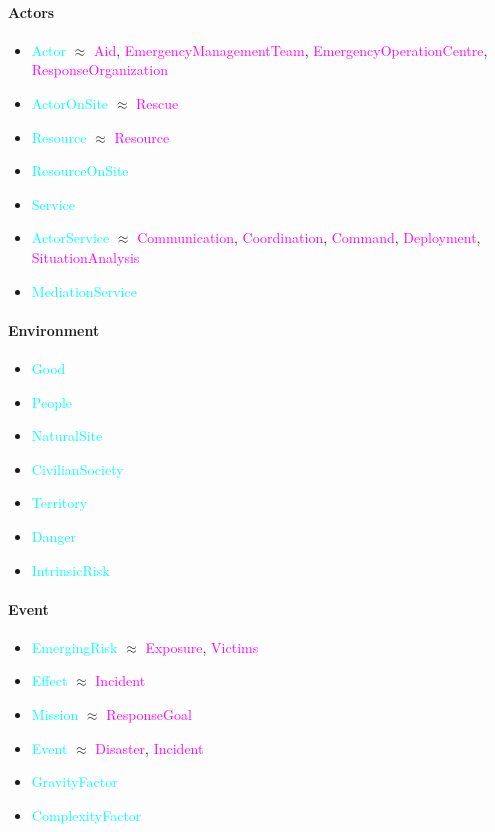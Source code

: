 \label{sec:information-si}
\paragraph{Actors}
\begin{itemize}
    \item \textcolor{cyan}{Actor} $\approx$ \textcolor{magenta}{Aid}, \textcolor{magenta}{EmergencyManagementTeam}, \textcolor{magenta}{EmergencyOperationCentre}, \textcolor{magenta}{ResponseOrganization}
    \item \textcolor{cyan}{ActorOnSite} $\approx$ \textcolor{magenta}{Rescue}
    \item \textcolor{cyan}{Resource} $\approx$ \textcolor{magenta}{Resource}
    \item \textcolor{cyan}{ResourceOnSite}
    \item \textcolor{cyan}{Service}
    \item \textcolor{cyan}{ActorService} $\approx$ \textcolor{magenta}{Communication}, \textcolor{magenta}{Coordination}, \textcolor{magenta}{Command}, \textcolor{magenta}{Deployment}, \textcolor{magenta}{SituationAnalysis}
    \item \textcolor{cyan}{MediationService}
\end{itemize}

\paragraph{Environment}
\begin{itemize}
    \item \textcolor{cyan}{Good}
    \item \textcolor{cyan}{People}
    \item \textcolor{cyan}{NaturalSite}
    \item \textcolor{cyan}{CivilianSociety}
    \item \textcolor{cyan}{Territory}
    \item \textcolor{cyan}{Danger}
    \item \textcolor{cyan}{IntrinsicRisk}
\end{itemize}

\paragraph{Event}
\begin{itemize}
    \item \textcolor{cyan}{EmergingRisk} $\approx$ \textcolor{magenta}{Exposure}, \textcolor{magenta}{Victims}
    \item \textcolor{cyan}{Effect} $\approx$ \textcolor{magenta}{Incident}
    \item \textcolor{cyan}{Mission} $\approx$ \textcolor{magenta}{ResponseGoal}
    \item \textcolor{cyan}{Event} $\approx$ \textcolor{magenta}{Disaster}, \textcolor{magenta}{Incident}
    \item \textcolor{cyan}{GravityFactor}
    \item \textcolor{cyan}{ComplexityFactor}
\end{itemize}

